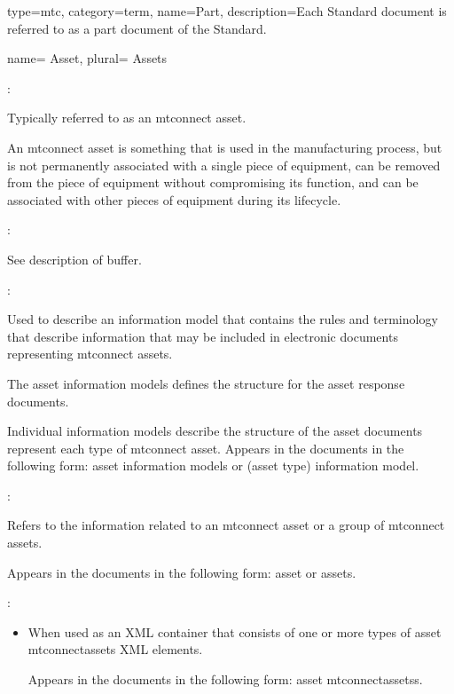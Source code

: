{
  type=mtc,
  category=term,
  name={Part},
  description={Each Standard document is referred to as a \gls{part document} of the Standard.}
}


{
  name= {Asset},
  plural= {Assets}
}
{
  :

  Typically referred to as an \gls{mtconnect asset}.

  An \gls{mtconnect asset} is something that is used in the manufacturing process, but is not permanently associated with a single piece of equipment, can be removed from the piece of equipment without compromising its function, and can be associated with other pieces of equipment during its lifecycle.

  :

  See description of \gls{buffer}.

  :

  Used to describe an \gls{information model} that contains the rules and terminology that describe information that may be included in electronic documents representing \glspl{mtconnect asset}.

  The \glspl{asset information model} defines the structure for the \glspl{asset response document}.

  Individual \glspl{information model} describe the structure of the \glspl{asset document} represent each type of \gls{mtconnect asset}. Appears in the documents in the following form: \glspl{asset information model} or (asset type) \gls{information model}.
  
  :

  Refers to the information related to an \gls{mtconnect asset} or a group of \glspl{mtconnect asset}.

  Appears in the documents in the following form: \gls{asset} or \glspl{asset}.

  :

  \begin{itemize}
      \item When used as an XML container that consists of one or more types of \gls{asset mtconnectassets} XML elements.
      
      Appears in the documents in the following form: \glspl{asset mtconnectassets}.
      

\end{itemize}}
